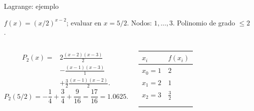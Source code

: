 \documentclass[main.tex]{subfiles}
\begin{document}
\begin{frame}[t]{Lagrange: ejemplo}
\par\noindent\begin{minipage}[t][7.5mm][t]{\textwidth}\small\strut $f(x)=(x/2)^{x-2}$; evaluar en $x=5/2$. Nodos: $1,\ldots,3$. Polinomio de grado $\le 2$.\end{minipage}\par\nointerlineskip
\begin{columns}[T]\small\setlength{\abovedisplayskip}{4pt}\setlength{\belowdisplayskip}{4pt}\small\begin{align*}
P_2(x)={}&2\frac{(x-2)(x-3)}{2}\\
&-\frac{(x-1)(x-3)}{1}\\
&+\frac32\frac{(x-1)(x-2)}{2}.
\end{align*}\[P_2(5/2)=-\frac14+\frac34+\frac9{16}=\frac{17}{16}=1.0625.\]\begingroup\small\setlength{\tabcolsep}{3pt}\begin{center}\begin{tabular}{|C{.42\textwidth}|C{.42\textwidth}|}\hline
\rule[-2mm]{0pt}{6mm}$x_i$&$f(x_i)$\\\hline
\rule[-2.5mm]{0pt}{6mm}$x_0=1$&$2$\\\hline
\rule[-2.5mm]{0pt}{6mm}$x_1=2$&$1$\\\hline
\rule[-2.5mm]{0pt}{6mm}$x_2=3$&$\frac{3}{2}$\\\hline
\rule[-2.5mm]{0pt}{6mm}&\\\hline
\rule[-2.5mm]{0pt}{6mm}&\\\hline
\end{tabular}\end{center}\endgroup\par
\end{columns}
\end{frame}
\end{document}
